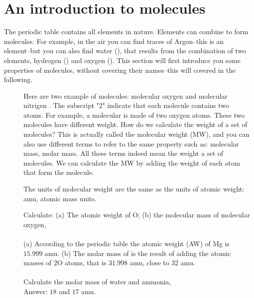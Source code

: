 \documentclass[main.tex]{subfiles}
\begin{document}
\section{An introduction to molecules}
The periodic table contains all elements in nature. Elements can combine to form molecules. For example, in the air you can find traces of Argon--this is an element--but you can also find water (), that results from the combination of two elements, hydrogen () and oxygen (). This section will first introduce you some properties of molecules, without covering their names--this will covered in the following.
\sloppy
\begin{description}
\item[] 
Here are two example of molecules: molecular oxygen  and molecular nitrigen . The subscript "2" indicate that each molecule contains two atoms. For example, a  molecular is made of two oxygen atoms. These two molecules have different weight. How do we calculate the weight of a set of molecules? This is actually called the molecular weight (MW), and you can also use different terms to refer to the same property such as: molecular mass, molar mass. All these terms indeed mean the weight a set of molecules. We can calculate the MW by adding the weight of each atom that form the molecule.
\item[] The units of molecular weight are the same as the units of atomic weight: amu, atomic mass units.

\begin{example} %
Calculate: (a) The atomic weight of O; (b) the molecular mass of molecular oxygen,  \\
\\
(a) According to the periodic table the atomic weight (AW) of Mg is $15.999$ amu. (b) The molar mass of  is the result of adding the atomic masses of 2O atoms, that is $31.998$ amu, close to 32 amu.\\
\faDiamond\ \\
Calculate the molar mass of water  and ammonia, \\
\flushright Answer: $18$ and $17$ amu.
\end{example}%

\end{description}
\end{document}
